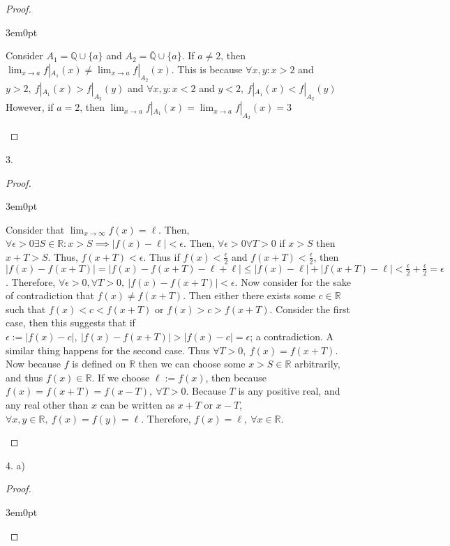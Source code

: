 \documentclass[11pt]{article}
\newcommand{\R}{\mathbb{R}}
\newcommand{\Q}{\mathbb{Q}}
\newenvironment{myproof}
{\begin{proof} \begin{adjustwidth}{3em}{0pt}$ $\par\nobreak\ignorespaces}
{\end{adjustwidth} \end{proof}}
\begin{document}
\begin{flushleft}
\begin{myproof}
Consider $A_1 = \Q \cup \{ a \}$ and $A_2 = \bar{\Q} \cup \{ a \}$. If $a \neq 2$, then $\lim_{x \to a} f|_{A_1}(x) \neq \lim_{x \to a} f|_{A_2} (x)$. This is because $\forall x,y: x > 2$ and $y > 2, \ f|_{A_1}(x) >  f|_{A_2} (y)$ and $\forall x,y: x < 2$ and $y<2, \ f|_{A_1}(x) <  f|_{A_2} (y)$ However, if $a = 2$, then $\lim_{x \to a} f|_{A_1}(x) = \lim_{x \to a} f|_{A_2} (x) = 3$

\end{myproof}

\newpage

3.

\begin{myproof}

Consider that $\lim_{x \to \infty} f(x) = \ell$. Then, $\forall \epsilon > 0 \exists S \in \R: x > S \implies |f(x) - \ell| < \epsilon$. Then, $\forall \epsilon > 0\forall T > 0$ if $x>S$ then $x+T>S$. Thus, $f(x+T) < \epsilon$. Thus if $f(x) < \frac{\epsilon}{2}$ and $f(x+T) < \frac{\epsilon}{2}$, then $|f(x) - f(x+T)|=|f(x)-f(x+T)-\ell + \ell| \leq |f(x) - \ell| + |f(x+T) - \ell| < \frac{\epsilon}{2} + \frac{\epsilon}{2} = \epsilon$. Therefore, $\forall \epsilon > 0, \forall T > 0, \ |f(x) - f(x+T)| < \epsilon$. Now consider for the sake of contradiction that $f(x) \neq f(x+T)$. Then either there exists some $c \in \R$ such that $f(x) < c < f(x+T)$ or $f(x) > c > f(x+T)$. Consider the first case, then this suggests that if $\epsilon := |f(x)-c|, \ |f(x) - f(x+T)| > |f(x) - c| = \epsilon$; a contradiction. A similar thing happens for the second case. Thus $\forall T > 0, \ f(x) = f(x+T)$. Now because $f$ is defined on $\R$ then we can choose some $x>S \in \R$ arbitrarily, and thus $f(x) \in \R$. If we choose $\ell := f(x)$, then because $f(x) = f(x+T) = f(x-T), \ \forall T > 0$. Because $T$ is any positive real, and any real other than $x$ can be written as $x + T$ or $x -T$, $\forall x,y \in \R, \ f(x) = f(y) = \ell$. Therefore, $f(x) = \ell, \ \forall x \in \R$.
\end{myproof}

\newpage

4. a)

\begin{myproof}


\end{myproof}
\end{flushleft}
\end{document}
